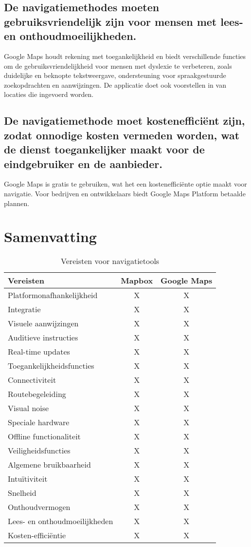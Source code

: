 \subsection*{De navigatiemethodes moeten gebruiksvriendelijk zijn voor mensen met lees- en onthoudmoeilijkheden.}
Google Maps houdt rekening met toegankelijkheid en biedt verschillende functies om de gebruiksvriendelijkheid voor mensen met dyslexie te verbeteren, zoals duidelijke en beknopte tekstweergave, ondersteuning voor spraakgestuurde zoekopdrachten en aanwijzingen. De applicatie doet ook voorstellen in van locaties die ingevoerd worden.
\subsection*{De navigatiemethode moet kostenefficiënt zijn, zodat onnodige kosten vermeden worden, wat de dienst toegankelijker maakt voor de eindgebruiker en de aanbieder.}
Google Maps is gratis te gebruiken, wat het een kostenefficiënte optie maakt voor navigatie. Voor bedrijven en ontwikkelaars biedt Google Maps Platform betaalde plannen.

\section{Samenvatting}
\label{sec:samenvatting}

\begin{table}[ht]
    \centering
    \begin{tabular}{|l|c|c|} \hline
        \textbf{Vereisten} & \textbf{Mapbox} & \textbf{Google Maps} \\ \hline
        Platformonafhankelijkheid  & X & X \\
        Integratie & X & X \\
        Visuele aanwijzingen  & X & X \\
        Auditieve instructies & X & X \\
        Real-time updates & X & X \\
        Toegankelijkheidsfuncties & X & X \\
        Connectiviteit & X & X \\
        Routebegeleiding & X & X \\
        Visual noise & X & X \\
        Speciale hardware & X & X \\
        Offline functionaliteit & X & X \\
        Veiligheidsfuncties & X & X \\
        Algemene bruikbaarheid & X & X \\
        Intuïtiviteit & X & X \\
        Snelheid & X & X \\
        Onthoudvermogen & X & X \\
        Lees- en onthoudmoeilijkheden & X & X \\
        Kosten-efficiëntie & X & X \\ \hline
    \end{tabular}
    \caption{Vereisten voor navigatietools}
    \label{tab:vereisten voor navigatietools}
\end{table}